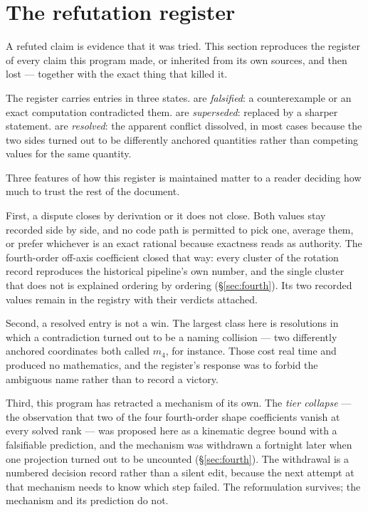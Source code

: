 \section{The refutation register}
\label{sec:register}

A refuted claim is evidence that it was tried. This section reproduces
the register of every claim this program made, or inherited from its own
sources, and then lost --- together with the exact thing that killed it.

The register carries \ContradictionTotal{} entries in three states.
\ContraFalsified{} are \emph{falsified}: a counterexample or an exact
computation contradicted them. \ContraSuperseded{} are
\emph{superseded}: replaced by a sharper statement. \ContraResolved{} are
\emph{resolved}: the apparent conflict dissolved, in most cases because
the two sides turned out to be differently anchored quantities rather
than competing values for the same quantity.

Three features of how this register is maintained matter to a reader
deciding how much to trust the rest of the document.

First, a dispute closes by derivation or it does not close. Both values
stay recorded side by side, and no code path is permitted to pick one,
average them, or prefer whichever is an exact rational because exactness
reads as authority. The fourth-order off-axis coefficient closed that way:
every cluster of the rotation record reproduces the historical pipeline's
own number, and the single cluster that does not is explained ordering by
ordering (\S\ref{sec:fourth}). Its two recorded values remain in the
registry with their verdicts attached.

Second, a resolved entry is not a win. The largest class here is
resolutions in which a contradiction turned out to be a naming
collision --- two differently anchored coordinates both called $m_4$, for
instance. Those cost real time and produced no mathematics, and the
register's response was to forbid the ambiguous name rather than to
record a victory.

Third, this program has retracted a mechanism of its own. The
\emph{tier collapse} --- the observation that two of the four
fourth-order shape coefficients vanish at every solved rank --- was
proposed here as a kinematic degree bound with a falsifiable
prediction, and the mechanism was withdrawn a fortnight later when one
projection turned out to be uncounted (\S\ref{sec:fourth}). The
withdrawal is a numbered decision record rather than a silent edit,
because the next attempt at that mechanism needs to know which step
failed. The reformulation survives; the mechanism and its prediction do
not.


